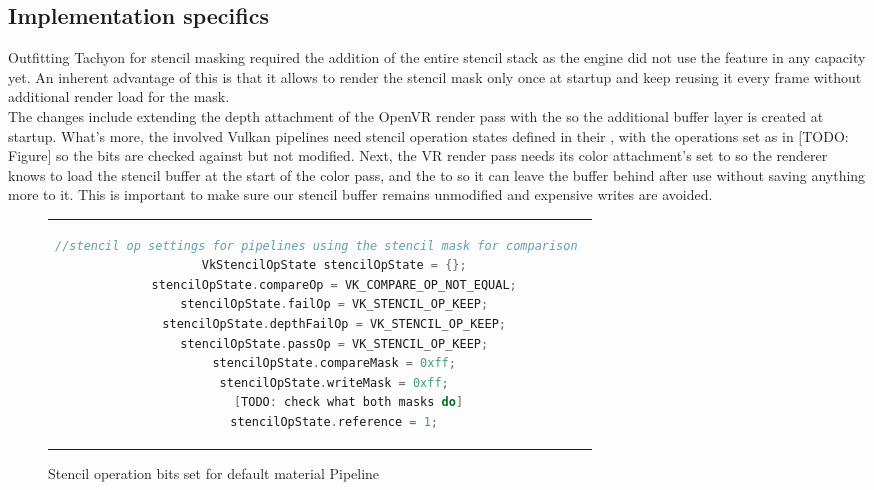 \subsection{Implementation specifics}
Outfitting Tachyon for stencil masking required the addition of the entire stencil stack as the engine did not use the feature in any capacity yet. An inherent advantage of this is that it allows to render the stencil mask only once at startup and keep reusing it every frame without additional render load for the mask. \\
The changes include extending the depth attachment of the OpenVR render pass with the  so the additional buffer layer is created at startup. What's more, the involved Vulkan pipelines need stencil operation states defined in their , with the operations set as in [TODO: Figure] so the bits are checked against but not modified. Next, the VR render pass needs its color attachment's  set to  so the renderer knows to load the stencil buffer at the start of the color pass, and the  to  so it can leave the buffer behind after use without saving anything more to it. This is important to make sure our stencil buffer remains unmodified and expensive writes are avoided. 

\begin{figure}[htpb]
  \centering
  \begin{tabular}{c}
  \begin{lstlisting}[language=C++]
//stencil op settings for pipelines using the stencil mask for comparison 
	VkStencilOpState stencilOpState = {};
	stencilOpState.compareOp = VK_COMPARE_OP_NOT_EQUAL;
	stencilOpState.failOp = VK_STENCIL_OP_KEEP;
	stencilOpState.depthFailOp = VK_STENCIL_OP_KEEP;
	stencilOpState.passOp = VK_STENCIL_OP_KEEP;
	stencilOpState.compareMask = 0xff;
	stencilOpState.writeMask = 0xff;
		[TODO: check what both masks do]
	stencilOpState.reference = 1;
	\end{lstlisting}
  \end{tabular}
  \caption[Material pipeline stencil operation bits]{Stencil operation bits set for default material Pipeline}\label{fig:lst_StencilOpState_MaterialPipeline}
\end{figure}

